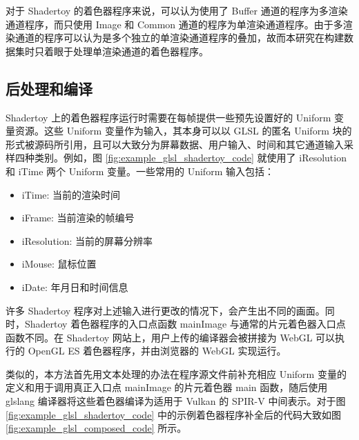 对于 Shadertoy 的着色器程序来说，可以认为使用了 Buffer 通道的程序为多渲染通道程序，而只使用 Image 和 Common 通道的程序为单渲染通道程序。由于多渲染通道的程序可以认为是多个独立的单渲染通道程序的叠加，故而本研究在构建数据集时只着眼于处理单渲染通道的着色器程序。

\subsection{后处理和编译}

Shadertoy 上的着色器程序运行时需要在每帧提供一些预先设置好的 Uniform 变量资源。这些 Uniform 变量作为输入，其本身可以以 GLSL 的匿名 Uniform 块的形式被源码所引用，且可以大致分为屏幕数据、用户输入、时间和其它通道输入采样四种类别。例如，图 \ref{fig:example_glsl_shadertoy_code} 就使用了 iResolution 和 iTime 两个 Uniform 变量。一些常用的 Uniform 输入包括：
\begin{itemize}
    \item iTime: 当前的渲染时间
    \item iFrame: 当前渲染的帧编号
    \item iResolution: 当前的屏幕分辨率
    \item iMouse: 鼠标位置
    \item iDate: 年月日和时间信息
\end{itemize}

许多 Shadertoy 程序对上述输入进行更改的情况下，会产生出不同的画面。同时，Shadertoy 着色器程序的入口点函数 mainImage 与通常的片元着色器入口点函数不同。在 Shadertoy 网站上，用户上传的编译器会被拼接为 WebGL 可以执行的 OpenGL ES 着色器程序，并由浏览器的 WebGL 实现运行。

类似的，本方法首先用文本处理的办法在程序源文件前补充相应 Uniform 变量的定义和用于调用真正入口点 mainImage 的片元着色器 main 函数，随后使用 glslang 编译器将这些着色器编译为适用于 Vulkan 的 SPIR-V 中间表示。对于图 \ref{fig:example_glsl_shadertoy_code} 中的示例着色器程序补全后的代码大致如图 \ref{fig:example_glsl_composed_code} 所示。

